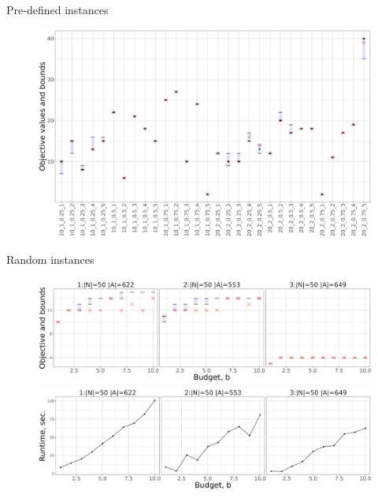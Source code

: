 \documentclass[10pt, xcolor=svgnames]{beamer}
\begin{document}
\begin{frame}[label={sec:org80c58a3}]{Pre-defined instances}
\begin{figure}
\includegraphics[width=\textwidth]{img/fig_known.png}
\end{figure}
\end{frame}
\begin{frame}[label={sec:org3f172d3}]{Random instances}
\begin{figure}
\includegraphics[width=\textwidth]{img/fig_bounds.png}\vspace{0.5ex}
\includegraphics[width=\textwidth]{img/fig_runtimes.png}
\end{figure}
\end{frame}
\end{document}
